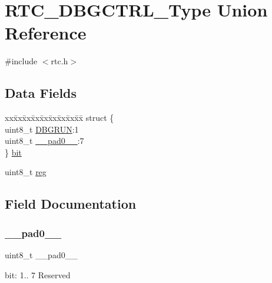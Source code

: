 \hypertarget{union_r_t_c___d_b_g_c_t_r_l___type}{}\section{R\+T\+C\+\_\+\+D\+B\+G\+C\+T\+R\+L\+\_\+\+Type Union Reference}
\label{union_r_t_c___d_b_g_c_t_r_l___type}


{\ttfamily \#include $<$rtc.\+h$>$}

\subsection*{Data Fields}
\begin{DoxyCompactItemize}
\item 
\begin{tabbing}
xx\=xx\=xx\=xx\=xx\=xx\=xx\=xx\=xx\=\kill
struct \{\\
\>uint8\_t \mbox{\hyperlink{union_r_t_c___d_b_g_c_t_r_l___type_a1e1cc79f6834369b9dd0c6676a0d8781}{DBGRUN}}:1\\
\>uint8\_t \mbox{\hyperlink{union_r_t_c___d_b_g_c_t_r_l___type_a8b4eebe79ded0459acec2f4950102ba3}{\_\_pad0\_\_}}:7\\
\} \mbox{\hyperlink{union_r_t_c___d_b_g_c_t_r_l___type_a7ccb5cb09b88386307475045d0da2db4}{bit}}\\

\end{tabbing}\item 
uint8\+\_\+t \mbox{\hyperlink{union_r_t_c___d_b_g_c_t_r_l___type_a9428adc9af4653a2050e2536b55dec8d}{reg}}
\end{DoxyCompactItemize}


\subsection{Field Documentation}
\mbox{\label{union_r_t_c___d_b_g_c_t_r_l___type_a8b4eebe79ded0459acec2f4950102ba3}} 
\subsubsection{\texorpdfstring{\_\_pad0\_\_}{\_\_pad0\_\_}}
{\footnotesize\ttfamily uint8\+\_\+t \+\_\+\+\_\+pad0\+\_\+\+\_\+}

bit\+: 1.. 7 Reserved \mbox{\label{union_r_t_c___d_b_g_c_t_r_l___type_a7ccb5cb09b88386307475045d0da2db4}} 
